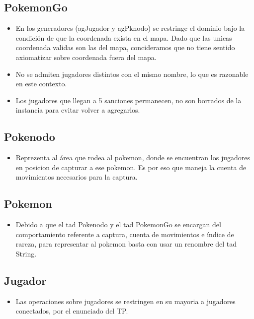 
\subsection{PokemonGo}

\begin{itemize}
\item{En los generadores (agJugador y agPknodo) se restringe el dominio bajo la condici\'on de que la coordenada exista en el mapa. Dado que las unicas coordenada validas son las del mapa, concideramos que no tiene sentido axiomatizar sobre coordenada fuera del mapa.}

\item{No se admiten jugadores distintos con el mismo nombre, lo que es razonable en este contexto.}

\item{Los jugadores que llegan a 5 sanciones permanecen, no son borrados de la instancia para evitar volver a agregarlos.}

\end{itemize}


\subsection{Pokenodo}

\begin{itemize}
\item{Reprezenta al \'area que rodea al pokemon, donde se encuentran los jugadores en posicion de capturar a ese pokemon. Es por eso que maneja la cuenta de movimientos necesarios para la captura.}
\end{itemize}

\subsection{Pokemon}

\begin{itemize}
\item{Debido a que el tad Pokenodo y el tad PokemonGo se encargan del comportamiento referente a captura, cuenta de movimientos e \'indice de rareza, para representar al pokemon basta con usar un renombre del tad String.  }
\end{itemize}

\subsection{Jugador}

\begin{itemize}
\item{Las operaciones sobre jugadores se restringen en su mayoria a jugadores conectados, por el enunciado del TP.}
\end{itemize}

